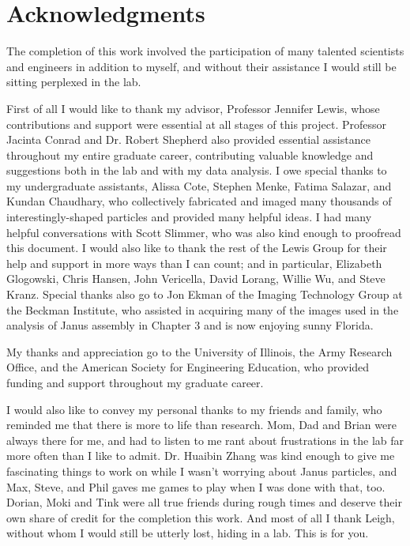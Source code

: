 \chapter*{Acknowledgments}

The completion of this work involved the participation of many 
talented scientists and engineers in addition to myself,
and without their assistance I would still be sitting perplexed in the lab.  

First of all I would like to thank my advisor, Professor Jennifer 
Lewis, whose contributions and support were essential at all 
stages of this project.  Professor Jacinta Conrad and Dr. Robert
Shepherd also provided essential assistance throughout my 
entire graduate career, contributing valuable knowledge and 
suggestions both in the lab and with my data analysis.  I owe
special thanks to my undergraduate assistants, Alissa Cote,
Stephen Menke, Fatima Salazar, and Kundan Chaudhary, who collectively 
fabricated and imaged many thousands of interestingly-shaped particles
and provided many helpful ideas.  I had many helpful conversations
with Scott Slimmer, who was also kind enough to proofread this
document.  I would also like to thank 
the rest of the Lewis Group for their help and support in more ways than
I can count; and in particular, Elizabeth Glogowski, Chris Hansen, John
Vericella, David Lorang, Willie Wu, and Steve Kranz.  Special thanks also go to Jon
Ekman of the Imaging Technology Group at the Beckman Institute, who
assisted in acquiring many of the images used in the analysis of Janus
assembly in Chapter 3 and is now enjoying sunny Florida.

My thanks and appreciation go to the University of 
Illinois, the Army Research Office, and 
the American Society for Engineering Education, who provided
funding and support throughout my graduate career.

I would also like to convey my personal thanks to my friends and 
family, who reminded me that there is more to life than research.
Mom, Dad and Brian were always there for me, and had to listen to me rant
about frustrations in the lab far more often than I like to admit.
Dr. Huaibin Zhang was kind enough to give me fascinating things
to work on while I wasn't worrying about Janus particles, and Max,
Steve, and Phil gaves me games to play when I was done with that, too.
Dorian, Moki and Tink were all true friends during rough times and 
deserve their own share of credit for the completion this work.
And most of all I thank Leigh, without whom I would still be 
utterly lost, hiding in a lab.  This is for you.
